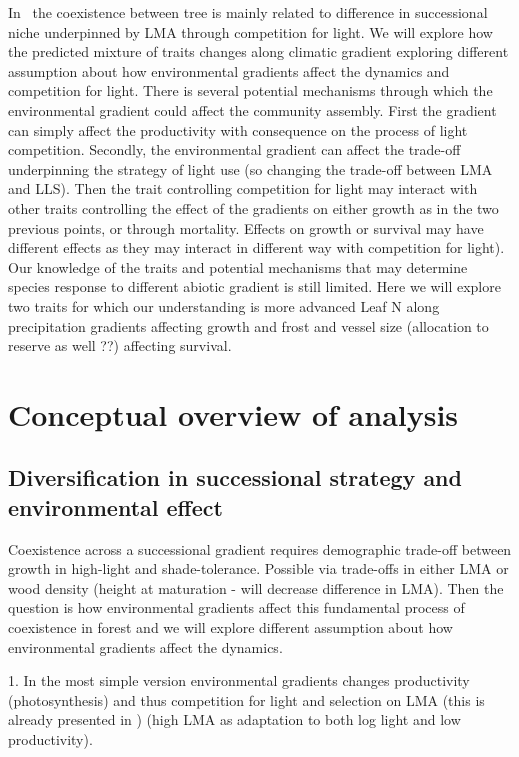\documentclass[a4paper,11pt]{article}
\begin{document}
In \plant\ the coexistence between tree is mainly related to difference in successional niche underpinned by LMA through competition for light. We will explore how the predicted mixture of traits changes along climatic gradient exploring different assumption about how environmental gradients
affect the dynamics and competition for light. There is several
potential mechanisms through which the environmental gradient could
affect the community assembly. First the gradient can simply affect
the productivity with consequence on the process of light
competition. Secondly, the environmental gradient can affect the
trade-off underpinning the strategy of light use (so changing the
trade-off between LMA and LLS). Then the trait controlling competition
for light may interact with other traits controlling the effect of the
gradients on either growth as in the two previous points, or through
mortality. Effects on growth or survival may have different effects as
they may interact in different way with competition for light). Our knowledge of the traits and potential mechanisms that
may determine species response to different abiotic gradient is still
limited. Here we will explore two traits for which our understanding
is more advanced Leaf N along precipitation gradients affecting growth
and frost and vessel size (allocation to reserve as well ??) affecting
survival.

\section{Conceptual overview of analysis}

\subsection{Diversification in successional strategy and environmental effect}

Coexistence across a successional gradient requires demographic trade-off between growth in high-light and shade-tolerance. Possible via trade-offs in either LMA or wood density (height at maturation - will decrease difference in LMA). Then the question is how environmental gradients affect this fundamental process of coexistence in forest and we will explore different assumption about how environmental gradients
affect the dynamics.



1. In the most simple version environmental gradients changes productivity (photosynthesis) and
thus competition for light and selection on LMA (this is already presented in \citet{Falster-2016}) (high LMA as adaptation to both log light and low productivity).
\end{document}
